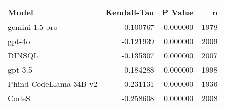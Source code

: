 \begin{tabular}{lrrr}
\toprule
Model & Kendall-Tau & P Value & n \\
\midrule
gemini-1.5-pro & -0.100767 & 0.000000 & 1978 \\
gpt-4o & -0.121939 & 0.000000 & 2009 \\
DINSQL & -0.135307 & 0.000000 & 2007 \\
gpt-3.5 & -0.184288 & 0.000000 & 1998 \\
Phind-CodeLlama-34B-v2 & -0.231131 & 0.000000 & 1936 \\
CodeS & -0.258608 & 0.000000 & 2008 \\
\bottomrule
\end{tabular}
